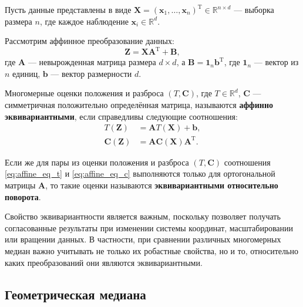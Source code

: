 Пусть данные представлены в виде $\mathbf{X} = (\mathbf{x}_1, \ldots, \mathbf{x}_n)^{\mathrm{T}} \in \mathbb{R}^{n \times d}$ --- выборка размера $n$, где каждое наблюдение $\mathbf{x}_i \in \mathbb{R}^d$.

Рассмотрим аффинное преобразование данных:
\begin{equation}\label{eq:affine_transform}
    \mathbf{Z} = \mathbf{X} \mathbf{A}^{\mathrm{T}}+ \mathbf{B},
\end{equation}
где $\mathbf{A}$ --- невырожденная матрица размера $d \times d$, а $\mathbf{B} = \mathbf{1}_n\mathbf{b}^{\mathrm{T}}$, где $\mathbf{1}_n$ --- вектор из $n$ единиц, $\mathbf{b}$ --- вектор размерности $d$.
\medskip

Многомерные оценки положения и разброса $(T, \mathbf{C})$, где $T\in\mathbb{R}^d$, $\mathbf{C}$ --- симметричная положительно определённая матрица, называются \textbf{аффинно эквивариантными}, если справедливы следующие соотношения:
\begin{align}
    T( \mathbf{Z}) &= \mathbf{A}T(\mathbf{X}) + \mathbf{b}, \label{eq:affine_eq_t} \\
    \mathbf{C}( \mathbf{Z}) &=  \mathbf{A} \mathbf{C}(\mathbf{X}) \mathbf{A}^{\mathrm{T}}. \label{eq:affine_eq_c}
\end{align}


Если же для пары из оценки положения и разброса $(T, \mathbf{C})$ соотношения \eqref{eq:affine_eq_t} и \eqref{eq:affine_eq_c} выполняются только для ортогональной матрицы $\mathbf{A}$, то такие оценки называются \textbf{эквивариантными относительно поворота}.

Свойство эквивариантности является важным, поскольку позволяет получать согласованные результаты при изменении системы координат, масштабировании или вращении данных. В частности, при сравнении различных многомерных медиан важно учитывать не только их робастные свойства, но и то, относительно каких преобразований они являются эквивариантными.


\subsection{Геометрическая медиана}

